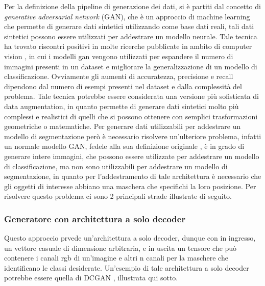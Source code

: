 Per la definizione della pipeline di generazione dei dati, si è partiti dal concetto di \textit{generative adversarial network} (GAN), che è un approccio di machine learning
che permette di generare dati sintetici utilizzando come base dati reali, tali dati sintetici possono essere utilizzati per addestrare un modello neurale.
Tale tecnica ha trovato riscontri positivi in molte ricerche pubblicate in ambito di computer vision \cite{ganbasedaugexample}, in cui i modelli gan vengono
utilizzati per espandere il numero di immagini presenti in un dataset e migliorare la generalizzazione di un modello di classificazione.
Ovviamente gli aumenti di accuratezza, precisione e recall dipendono dal numero di esempi presenti nel dataset e dalla complessità del problema.
Tale tecnica potrebbe essere considerata una versione più sofisticata di data augmentation, in quanto permette di generare dati sintetici molto più complessi
e realistici di quelli che si possono ottenere con semplici trasformazioni geometriche o matematiche.
Per generare dati utilizzabili per addestrare un modello di segmentazione però è necessario risolvere un'ulteriore problema,
infatti un normale modello GAN, fedele alla sua definizione originale \cite{goodfellow2014generative}, è in grado di generare intere immagini,
che possono essere utilizzate per addestrare un modello di classificazione, ma non sono utilizzabili per addestrare un modello di segmentazione,
in quanto per l'addestramento di tale architettura è necessario che gli oggetti di interesse abbiano una maschera che specifichi la loro posizione.
Per risolvere questo problema ci sono 2 principali strade illustrate di seguito.

\subsubsection{Generatore con architettura a solo decoder}

    Questo approccio prvede un'architettura a solo decoder, dunque con in ingresso,
    un vettore casuale di dimensione arbitraria, e in uscita un tensore che può contenere i canali rgb di un'imagine e altri n canali per la maschere che
    identificano le classi desiderate.
    Un'esempio di tale architettura a solo decoder potrebbe essere quella di DCGAN \cite{radford2016unsupervised}, illustrata qui sotto.

